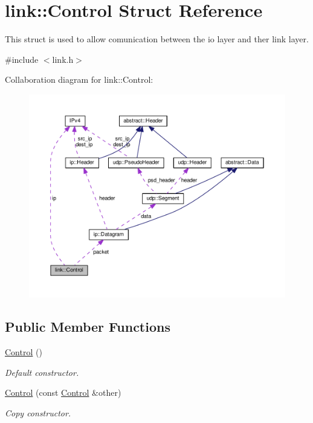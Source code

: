 \hypertarget{structlink_1_1Control}{}\section{link\+:\+:Control Struct Reference}
\label{structlink_1_1Control}


This struct is used to allow comunication between the io layer and ther link layer.  




{\ttfamily \#include $<$link.\+h$>$}



Collaboration diagram for link\+:\+:Control\+:\nopagebreak
\begin{figure}[H]
\begin{center}
\leavevmode
\includegraphics[width=350pt]{structlink_1_1Control__coll__graph}
\end{center}
\end{figure}
\subsection*{Public Member Functions}
\begin{DoxyCompactItemize}
\item 
\hyperlink{structlink_1_1Control_a516338434f0fb973c8f790e8aba08ec6}{Control} ()
\begin{DoxyCompactList}\small\item\em Default constructor. \end{DoxyCompactList}\item 
\hyperlink{structlink_1_1Control_af69072be879940dcb70c80cc40f2e46a}{Control} (const \hyperlink{structlink_1_1Control}{Control} \&other)
\begin{DoxyCompactList}\small\item\em Copy constructor. \end{DoxyCompactList}\end{DoxyCompactItemize}
